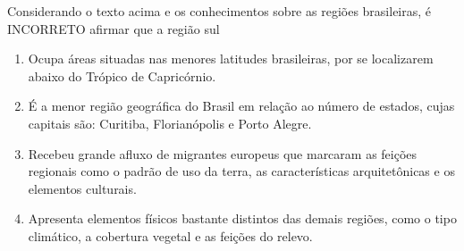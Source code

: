 Considerando o texto acima e os conhecimentos sobre as regiões brasileiras, é INCORRETO afirmar que a região sul\begin{enumerate}
\item Ocupa áreas situadas nas menores latitudes brasileiras, por se localizarem abaixo do Trópico de
       Capricórnio.
\item É a menor região geográfica do Brasil em relação ao número de estados, cujas capitais são: Curitiba,
       Florianópolis e Porto Alegre.
\item Recebeu grande afluxo de migrantes europeus que marcaram as feições regionais como o padrão de uso
       da terra, as características arquitetônicas e os elementos culturais.
\item Apresenta elementos físicos bastante distintos das demais regiões, como o tipo climático, a cobertura
       vegetal e as feições do relevo.
\end{enumerate}
